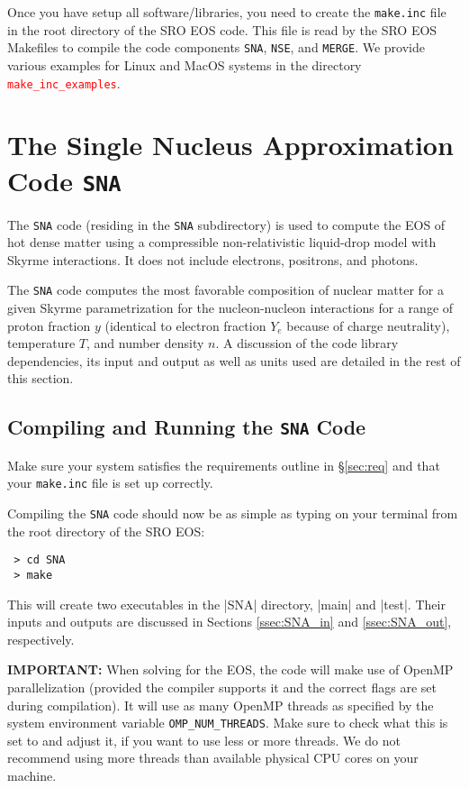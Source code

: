 \documentclass[letterpaper,11pt]{refart}
\begin{document}
Once you have setup all software/libraries, you need to create the
\texttt{make.inc} file in the root directory of the SRO EOS code. This
file is read by the SRO EOS Makefiles to compile the code components
\texttt{SNA}, \texttt{NSE}, and \texttt{MERGE}. We provide various
examples for Linux and MacOS systems in the directory \textcolor{red}{\texttt{make\_inc\_examples}}.


\section{The Single Nucleus Approximation Code \texttt{SNA}}\label{sec:SNA}

The \texttt{SNA} code (residing in the \texttt{SNA} subdirectory) is
used to compute the EOS of hot dense matter using a compressible
non-relativistic liquid-drop model with Skyrme interactions. It does
not include electrons, positrons, and photons.

The \texttt{SNA} code computes the most favorable composition of
nuclear matter for a given Skyrme parametrization for the
nucleon-nucleon interactions for a range of proton fraction $y$
(identical to electron fraction $Y_e$ because of charge neutrality),
temperature $T$, and number density $n$. A discussion of the code
library dependencies, its input and output as well as units used are
detailed in the rest of this section.


\subsection{Compiling and Running the \texttt{SNA} Code}\label{ssec:SNA_dep}

Make sure your system satisfies the requirements outline in
\S\ref{sec:req} and that your \texttt{make.inc} file is set up
correctly.

Compiling the \verb|SNA| code should now be as simple as typing on
your terminal from the root directory of the SRO EOS:

\begin{verbatim}
 > cd SNA
 > make
\end{verbatim}


This will create two executables in the \verbfile|SNA| directory,
\verbexec|main| and \verbexec|test|.  Their inputs and outputs are
discussed in Sections \ref{ssec:SNA_in} and \ref{ssec:SNA_out},
respectively.

\textbf{IMPORTANT:} When solving for the EOS, the code will make use
of OpenMP parallelization (provided the compiler supports it and the
correct flags are set during compilation). It will use as many OpenMP
threads as specified by the system environment variable
\texttt{OMP\_NUM\_THREADS}. Make sure to check what this is set to and
adjust it, if you want to use less or more threads. We do not
recommend using more threads than available physical CPU cores on your
machine.
\end{document}
